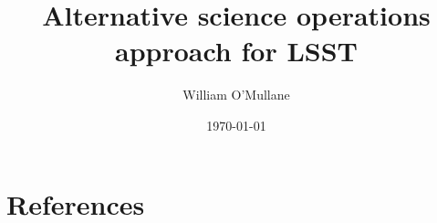 \documentclass[OPS,authoryear,toc]{lsstdoc}
\title{Alternative science operations approach for  LSST }
\author{%
William O'Mullane
}
\date{\today}
\begin{document}

\mkshorttitle




\appendix
\section{References} \label{sec:bib}


\printglossaries
%
\end{document}
